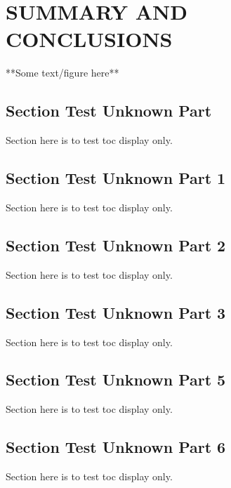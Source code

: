 \chapter{SUMMARY AND CONCLUSIONS \label{cha:Summary}}

**Some text/figure here**

\section{Section Test Unknown Part}
Section here is to test toc display only.

\section{Section Test Unknown Part 1}
Section here is to test toc display only.

\section{Section Test Unknown Part 2}
Section here is to test toc display only.

\section{Section Test Unknown Part 3}
Section here is to test toc display only.



\section{Section Test Unknown Part 5}
Section here is to test toc display only.

\section{Section Test Unknown Part 6}
Section here is to test toc display only.

